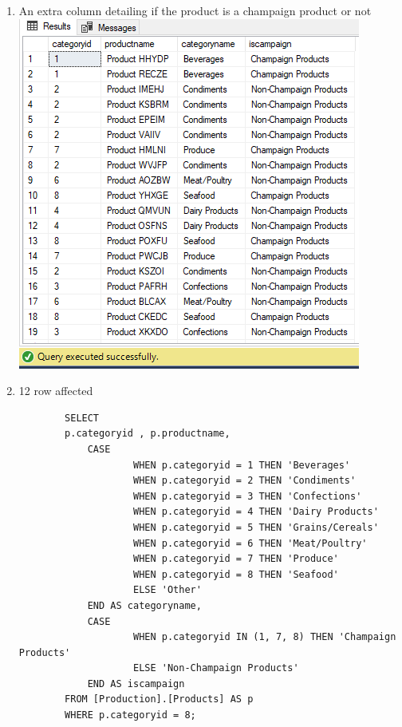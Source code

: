 \documentclass[12pt,titlepage]{article}
\begin{document}
\begin{enumerate}
{    }
    \newpage
    \item An extra column detailing if the product is a champaign product or not\\
    \includegraphics[width=.9\textwidth]{images/figures/fig5.png}
    \newpage
    \item 12 row affected
    \begin{verbatim}
        SELECT
        p.categoryid , p.productname,
            CASE
                    WHEN p.categoryid = 1 THEN 'Beverages'
                    WHEN p.categoryid = 2 THEN 'Condiments'
                    WHEN p.categoryid = 3 THEN 'Confections'
                    WHEN p.categoryid = 4 THEN 'Dairy Products'
                    WHEN p.categoryid = 5 THEN 'Grains/Cereals'
                    WHEN p.categoryid = 6 THEN 'Meat/Poultry'
                    WHEN p.categoryid = 7 THEN 'Produce'
                    WHEN p.categoryid = 8 THEN 'Seafood'
                    ELSE 'Other'
            END AS categoryname,
            CASE
                    WHEN p.categoryid IN (1, 7, 8) THEN 'Champaign Products'
                    ELSE 'Non-Champaign Products'
            END AS iscampaign
        FROM [Production].[Products] AS p
        WHERE p.categoryid = 8;
    \end{verbatim}
    \resizebox{.9\textwidth}{!}{
}
\end{enumerate}
\end{document}
